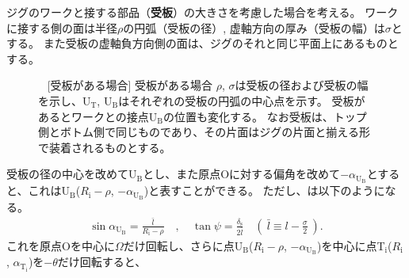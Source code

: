 \clearpage
ジグのワークと接する部品（\textbf{受板}）の大きさを考慮した場合を考える。
ワークに接する側の面は半径$\rho$の円弧（受板の径）, 虚軸方向の厚み（受板の幅）は$\sigma$とする。
また受板の虚軸負方向側の面は、ジグのそれと同じ平面上にあるものとする。
\begin{figure}[p]%
\begin{Figbox}[valign=top]%
%
\vfill~
[受板がある場合]{%
 受板がある場合\newline
 $\rho$, $\sigma$は受板の径および受板の幅を示し、U$_\mathrm T$, U$_\mathrm B$はそれぞれの受板の円弧の中心点を示す。
 受板があるとワークとの接点U$_\mathrm B$の位置も変化する。
 なお受板は、トップ側とボトム側で同じものであり、その片面はジグの片面と揃える形で装着されるものとする。
 }%
\end{Figbox}%
\end{figure}%
受板の径の中心を改めてU$_\mathrm B$とし、また原点Oに対する偏角を改めて$-\alpha_{\mathrm U_\mathrm B}$とすると、これはU$_\mathrm B$($R_\mathrm i-\rho$, $-\alpha_{\mathrm U_\mathrm B}$)と表すことができる。
ただし、は以下のようになる。
\begin{align*}
  \sin\alpha_{\mathrm U_\mathrm B} = \frac{\bar l}{R_\mathrm i-\rho}\quad, \quad
  \tan\psi = \frac{\delta_\mathrm s}{2\bar l} \quad
  \left(~\bar l \equiv l-\frac\sigma2~\right).
\end{align*}
これを原点Oを中心に$\Omega$だけ回転し、さらに点U$_\mathrm B$($R_\mathrm i-\rho$, $-\alpha_{\mathrm U_\mathrm B}$)を中心に点T$_\mathrm i$($R_\mathrm i$, $\alpha_{\mathrm T_\mathrm i}$)を$-\theta$だけ回転すると、
